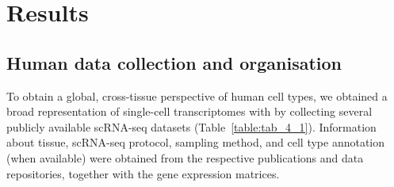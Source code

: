 \section{Results}
\label{section4.2}
\subsection{Human data collection and organisation}
\label{section4.2_coll}
To obtain a global, cross-tissue perspective of human cell types, we obtained a broad representation of single-cell transcriptomes with by collecting several publicly available scRNA-seq datasets (Table~\ref{table:tab_4_1}). Information about tissue, scRNA-seq protocol, sampling method, and cell type annotation (when available) were obtained from the respective publications and data repositories, together with the gene expression matrices.

